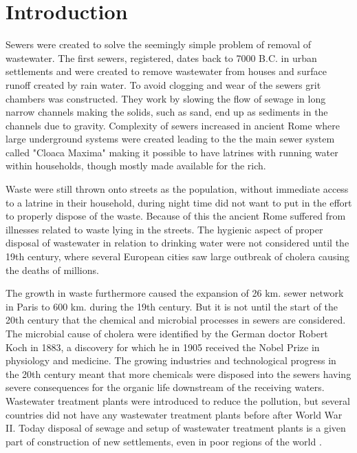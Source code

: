 \chapter{Introduction}
\label{ch:introduction}

Sewers were created to solve the seemingly simple problem of removal of wastewater. The first sewers, registered, dates back to 7000 B.C. in urban settlements and were created to remove wastewater from houses and surface runoff created by rain water. To avoid clogging and wear of the sewers grit chambers was constructed. They work by slowing the flow of sewage in long narrow channels making the solids, such as sand, end up as sediments in the channels due to gravity. Complexity of sewers increased in ancient Rome where large underground systems were created leading to the the main sewer system called "Cloaca Maxima" making it possible to have latrines with running water within households, though mostly made available for the rich.

Waste were still thrown onto streets as the population, without immediate access to a latrine in their household, during night time did not want to put in the effort to properly dispose of the waste. Because of this the ancient Rome suffered from illnesses related to waste lying in the streets. The hygienic aspect of proper disposal of wastewater in relation to drinking water were not considered until the 19th century, where several European cities saw large outbreak of cholera causing the deaths of millions. 

The growth in waste furthermore caused the expansion of 26 km. sewer network in Paris to 600 km. during the 19th century. But it is not until the start of the 20th century that the chemical and microbial processes in sewers are considered. The microbial cause of cholera were identified by the German doctor Robert Koch in 1883, a discovery for which he in 1905 received the Nobel Prize in physiology and medicine. The growing industries and technological progress in the 20th century meant that more chemicals were disposed into the sewers having severe consequences for the organic life downstream of the receiving waters. Wastewater treatment plants were introduced to reduce the pollution, but several countries did not have any wastewater treatment plants before after World War II. Today disposal of sewage and setup of wastewater treatment plants is a given part of construction of new settlements, even in poor regions of the world \cite{Sewer_processes}.


